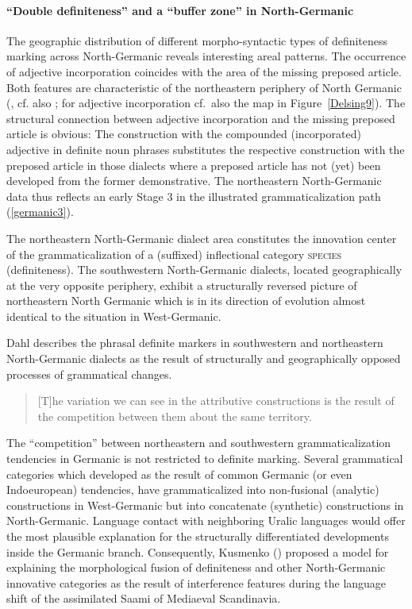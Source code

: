 {\paragraph{“Double definiteness” and a “buffer zone” in North-Germanic}\label{buffer}
The geographic distribution of different morpho-syntactic types of definiteness marking across North-Germanic reveals interesting areal patterns. The occurrence of adjective incorporation coincides with the area of the missing preposed article. Both features are characteristic of the northeastern periphery of North Germanic (\citealt{delsing1996b}, cf. also \citealt{riesler2001a,riesler2002a}; for adjective incorporation cf.~also the map in Figure~\ref{Delsing9}). The structural connection between adjective incorporation and the missing preposed article is obvious: The construction with the compounded (incorporated) adjective in definite noun phrases substitutes the respective construction with the preposed article in those dialects where a preposed article has not (yet) been developed from the former demonstrative. The northeastern North-Germanic data thus reflects an early Stage 3 in the illustrated grammaticalization path (\ref{germanic3}).

The northeastern North-Germanic dialect area constitutes the innovation center of the grammaticalization of a (suffixed) inflectional category \textsc{species} (definiteness). The southwestern North-Germanic dialects, located geographically at the very opposite periphery, exhibit a structurally reversed picture of northeastern North Germanic which is in its direction of evolution almost identical to the situation in West-Germanic.

Dahl describes the phrasal definite markers in southwestern and northeastern North-Germanic dialects as the result of structurally and geographically opposed processes of grammatical changes.
\begin{quote}
[T]he variation we can see in the attributive constructions is the result of the competition between them about the same territory. \citep[147]{dahl2003}
\end{quote}
The “competition” between northeastern and southwestern grammaticalization tendencies in Germanic is not restricted to definite marking. Several grammatical categories which developed as the result of common Germanic (or even Indoeuropean) tendencies, have grammaticalized into non-fusional (analytic) constructions in West-Germanic but into concatenate (synthetic) constructions in North-Germanic. Language contact with neighboring Uralic languages would offer the most plausible explanation for the structurally differentiated developments inside the Germanic branch. Consequently, Kusmenko (\citeyear{kusmenko2008}) proposed a model for explaining the morphological fusion of definiteness and other North-Germanic innovative categories as the result of interference features during the language shift of the assimilated Saami of Mediaeval Scandinavia.

}
